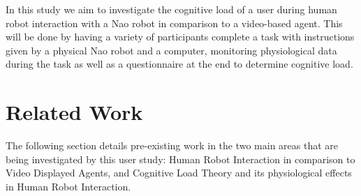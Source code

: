 \documentclass[conference]{IEEEtran}
\begin{document}
In this study we aim to investigate the cognitive load of a user during human robot interaction with a Nao robot \cite{web:NaoRobot} in comparison to a video-based agent. This will be done by having a variety of participants complete a task with instructions given by a physical Nao robot and a computer, monitoring physiological data during the task as well as a questionnaire at the end to determine cognitive load. 

\section{Related Work}
The following section details pre-existing work in the two main areas that are being investigated by this user study: Human Robot Interaction in comparison to Video Displayed Agents, and Cognitive Load Theory and its physiological effects in Human Robot Interaction.
\end{document}
